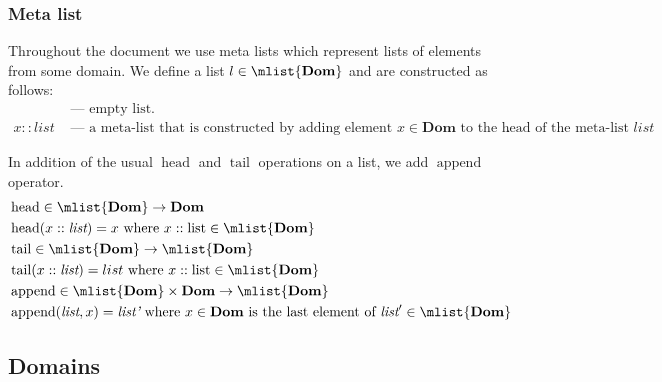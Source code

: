 \documentclass[a4paper,oneside,fleqn]{article}
\DeclareMathOperator{\head}{head}
\DeclareMathOperator{\tail}{tail}
\DeclareMathOperator{\append}{append}
\newcommand{\ddom}{\mathbf{Dom}}    %
\begin{document}
\subsubsection{Meta list}
\label{subsubsec:meta-list}

Throughout the document we use meta lists which represent lists of elements from some domain.
We define a list $l \in \mlist{\ddom}$ and are constructed as follows:
\begin{align*}
    [] &\text{ --- empty list}.\\
    x :: \textit{list} &\text{ --- a meta-list that is constructed by adding element $x \in \ddom$ to the head of the meta-list $list$}.
\end{align*}

In addition of the usual $\head$ and $\tail$ operations on a list, we add $\append$ operator.
\begin{align*}
    &\head \in \mlist{\ddom} \rightarrow \ddom\\
    &\head(x :: \textit{list}) = x \text{ where $x :: \text{list} \in \mlist{\ddom}$}\\
    &\tail \in \mlist{\ddom} \rightarrow \mlist{\ddom}\\
    &\tail(x :: \textit{list}) = list \text{ where $x :: \text{list} \in \mlist{\ddom}$}\\
    &\append \in \mlist{\ddom} \times \ddom \rightarrow \mlist{\ddom}\\
    &\append(\textit{list}, x) = \textit{list'} \text{ where $x \in \ddom$ is the last element of $\textit{list}' \in \mlist{\ddom}$}\\
\end{align*}


\subsection{Domains}
\label{subsec:domains}

\newcommand{\dlocation}{\mathbf{Location}}
\newcommand{\loc}{\ensuremath{\alpha}}

\newcommand{\expr}{\ensuremath{\mathit{E}}}
\newcommand{\expri}[1]{\expr_\ensuremath{\mathit{#1}}}
\newcommand{\exprs}{\expr\ensuremath{\mathit{s}}}
\newcommand{\membermeta}{\ensuremath{\mathit{M}}}

\newcommand{\stmt}{\ensuremath{\mathit{S}}}
\newcommand{\stmti}[1]{\stmt_\ensuremath{#1}}
\newcommand{\stmts}{\stmt\ensuremath{\mathit{s}}}
\end{document}
